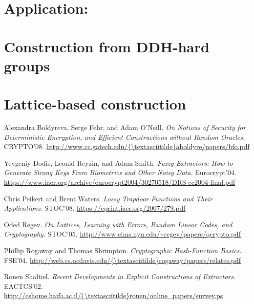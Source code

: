 \documentclass{llncs}
\begin{document}
\section{Application: \indcca}


\section{Construction from DDH-hard groups}


\section{Lattice-based construction}


\begin{thebibliography}{5}

    Alexandra Boldyreva, Serge Fehr, and Adam O'Neill.
    \textit{On Notions of Security for Deterministic Encryption, and Efficient
    Constructions without Random Oracles.}
    CRYPTO'08.
    \url{http://www.cc.gatech.edu/{\textasciitilde}aboldyre/papers/bfo.pdf}

    Yevgeniy Dodis, Leonid Reyzin, and Adam Smith.
    \textit{Fuzzy Extractors: How to Generate Strong Keys From Biometrics and
    Other Noisy Data.}
    Eurocrypt'04.
    \url{https://www.iacr.org/archive/eurocrypt2004/30270518/DRS-ec2004-final.pdf}

    Chris Peikert and Brent Waters.
    \textit{Lossy Trapdoor Functions and Their Applications.}
    STOC'08.
    \url{https://eprint.iacr.org/2007/279.pdf}

    Oded Regev.
    \textit{On Lattices, Learning with Errors, Random Linear Codes, and
    Cryptography.}
    STOC'05.
    \url{http://www.cims.nyu.edu/~regev/papers/qcrypto.pdf}

    Phillip Rogaway and Thomas Shrimpton.
    \textit{Cryptographic Hash-Function Basics.}
    FSE'04.
    \url{http://web.cs.ucdavis.edu/{\textasciitilde}rogaway/papers/relates.pdf}

    Ronen Shaltiel.
    \textit{Recent Developments in Explicit Constructions of Extractors.}
    EACTCS'02.
    \url{http://cshome.haifa.ac.il/{\textasciitilde}ronen/online\_papers/survey.ps}

\end{thebibliography}
\end{document}
